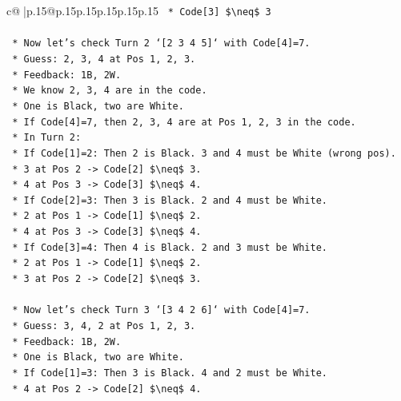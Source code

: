 \documentclass{article}
\begin{document}
{\begin{supertabular}{c@{$\;$}|p{.15\linewidth}@{}p{.15\linewidth}p{.15\linewidth}p{.15\linewidth}p{.15\linewidth}p{.15\linewidth}}
{{{\texttt{        *   Code{[}3{]} \$\textbackslash{}neq\$ 3} \\
\\ 
\texttt{    *   Now let's check Turn 2 `{[}2 3 4 5{]}` with Code{[}4{]}=7.} \\
\texttt{        *   Guess: 2, 3, 4 at Pos 1, 2, 3.} \\
\texttt{        *   Feedback: 1B, 2W.} \\
\texttt{        *   We know 2, 3, 4 are in the code.} \\
\texttt{        *   One is Black, two are White.} \\
\texttt{        *   If Code{[}4{]}=7, then 2, 3, 4 are at Pos 1, 2, 3 in the code.} \\
\texttt{        *   In Turn 2:} \\
\texttt{            *   If Code{[}1{]}=2: Then 2 is Black. 3 and 4 must be White (wrong pos).} \\
\texttt{                *   3 at Pos 2 {-}> Code{[}2{]} \$\textbackslash{}neq\$ 3.} \\
\texttt{                *   4 at Pos 3 {-}> Code{[}3{]} \$\textbackslash{}neq\$ 4.} \\
\texttt{            *   If Code{[}2{]}=3: Then 3 is Black. 2 and 4 must be White.} \\
\texttt{                *   2 at Pos 1 {-}> Code{[}1{]} \$\textbackslash{}neq\$ 2.} \\
\texttt{                *   4 at Pos 3 {-}> Code{[}3{]} \$\textbackslash{}neq\$ 4.} \\
\texttt{            *   If Code{[}3{]}=4: Then 4 is Black. 2 and 3 must be White.} \\
\texttt{                *   2 at Pos 1 {-}> Code{[}1{]} \$\textbackslash{}neq\$ 2.} \\
\texttt{                *   3 at Pos 2 {-}> Code{[}2{]} \$\textbackslash{}neq\$ 3.} \\
\\ 
\texttt{    *   Now let's check Turn 3 `{[}3 4 2 6{]}` with Code{[}4{]}=7.} \\
\texttt{        *   Guess: 3, 4, 2 at Pos 1, 2, 3.} \\
\texttt{        *   Feedback: 1B, 2W.} \\
\texttt{        *   One is Black, two are White.} \\
\texttt{        *   If Code{[}1{]}=3: Then 3 is Black. 4 and 2 must be White.} \\
\texttt{            *   4 at Pos 2 {-}> Code{[}2{]} \$\textbackslash{}neq\$ 4.} \\
}}}
\end{supertabular}}
\end{document}
